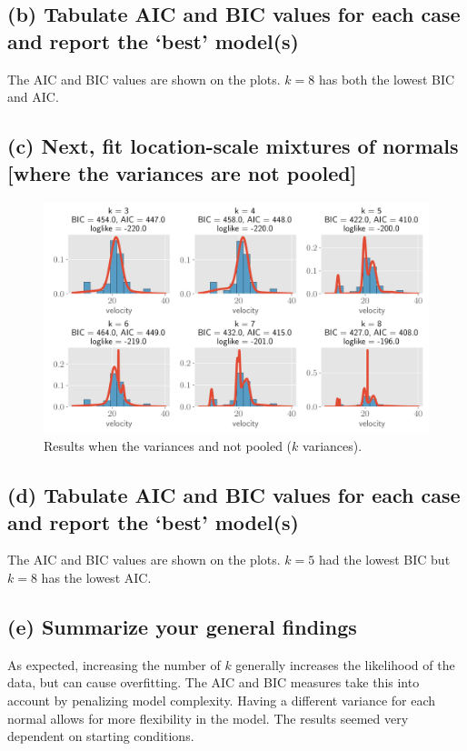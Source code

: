 \documentclass[11pt]{article}
\begin{document}
\subsection*{(b) Tabulate AIC and BIC values for each case and report the ‘best’ model(s)}

The AIC and BIC values are shown on the plots. $k =8$ has both the lowest BIC and AIC.

\subsection*{(c) Next, fit location-scale mixtures of normals [where the variances are not pooled]}

\begin{figure}[!h]
    \centering
    \includegraphics[scale=.6
    ]{homework_4/figures/galaxies_2.png}
    \caption{Results when the variances and not pooled ($k$ variances).}
    \label{fig:my_label}
\end{figure}

\newpage
\subsection*{(d) Tabulate AIC and BIC values for each case and report the ‘best’ model(s)}

The AIC and BIC values are shown on the plots. $k =5$ had the lowest BIC but $k=8$ has the lowest AIC.


\subsection*{(e) Summarize your general findings}
As expected, increasing the number of $k$ generally increases the likelihood of the data, but can cause overfitting. The AIC and BIC measures take this into account by penalizing model complexity. Having a different variance for each normal allows for more flexibility in the model. The results seemed very dependent on starting conditions.
\end{document}

